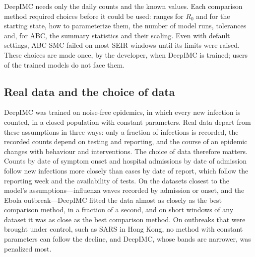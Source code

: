 \documentclass[12pt]{article}
\begin{document}
DeepIMC needs only the daily counts and the known values. Each comparison method required choices
before it could be used: ranges for $R_0$ and for the starting state, how to parameterize them, the
number of model runs, tolerances and, for ABC, the summary statistics and their scaling. Even with
default settings, ABC-SMC failed on most SEIR windows until its limits were raised. These choices
are made once, by the developer, when DeepIMC is trained; users of the trained models do not face them.

\subsection{Real data and the choice of data}

DeepIMC was trained on noise-free epidemics, in which every new infection is counted, in a closed
population with constant parameters. Real data depart from these assumptions in three ways: only a
fraction of infections is recorded, the recorded counts depend on testing and reporting, and the course
of an epidemic changes with behaviour and interventions. The choice of data therefore matters. Counts by
date of symptom onset and hospital admissions by date of admission follow new infections more closely
than cases by date of report, which follow the reporting week and the availability of tests. On the
datasets closest to the model's assumptions---influenza waves recorded by admission or onset, and the
Ebola outbreak---DeepIMC fitted the data almost as closely as the best comparison method, in a fraction of
a second, and on short windows of any dataset it was as close as the best comparison method. On outbreaks
that were brought under control, such as SARS in Hong Kong, no method with constant parameters can follow the
decline, and DeepIMC, whose bands are narrower, was penalized most.
\end{document}
